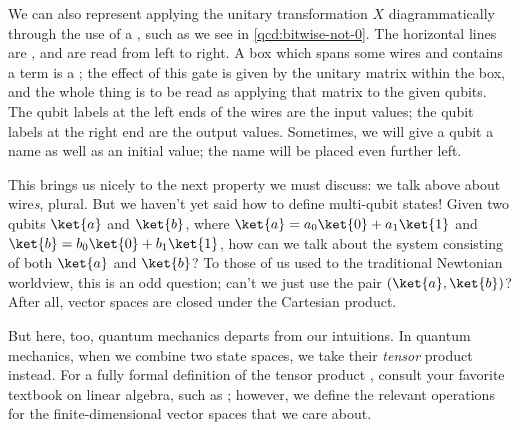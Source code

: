 We can also represent applying the unitary transformation $X$ diagrammatically
through the use of a , such as we see in
\cref{qcd:bitwise-not-0}.  The horizontal lines are , and are read
from left to right.  A box which spans some wires and contains a term is a
; the effect of this gate is given by the unitary matrix within the
box, and the whole thing is to be read as applying that matrix to the given
qubits.\footnotemark{}  The qubit labels at the left ends of the wires are the
input values; the qubit labels at the right end are the output values.
Sometimes, we will give a qubit a name as well as an initial value; the name
will be placed even further left.


This brings us nicely to the next property we must discuss: we talk above about
wire\emph{s}, plural.  But we haven't yet said how to define multi-qubit states!
Given two qubits $\ket{a}$ and $\ket{b}$, where $\ket{a} = a_0\ket{0} +
a_1\ket{1}$ and $\ket{b} = b_0\ket{0} + b_1\ket{1}$, how can we talk about the
system consisting of both $\ket{a}$ and $\ket{b}$?  To those of us used to the
traditional Newtonian worldview, this is an odd question; can't we just use the
pair $(\ket{a},\ket{b})$?  After all, vector spaces are closed under the
Cartesian product.

But here, too, quantum mechanics departs from our intuitions.  In quantum
mechanics, when we combine two state spaces, we take their \emph{tensor} product
instead.  For a fully formal definition of the tensor product , consult your favorite textbook on linear algebra,
such as ; however, we define the relevant operations for the
finite-dimensional vector spaces that we care about.

